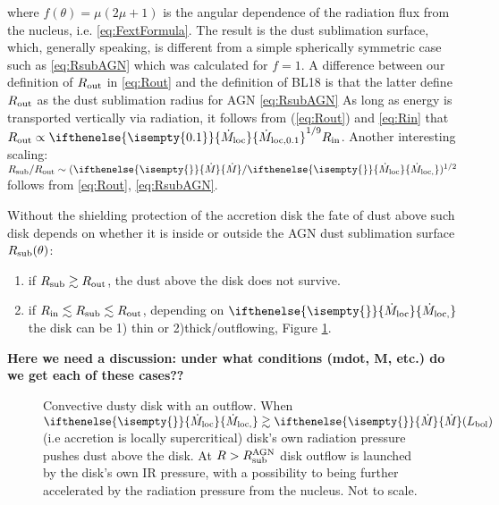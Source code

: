 \documentclass[12pt,english,preprint]{aastex}
\newcommand{\su}[2]{#1_{\rm #2}}
\newcommand{\mdt}[1][]{ 
  \ifthenelse{\isempty{#1}}
  {\dot{M}_{\rm loc}}
  { {\dot M}_{\rm{loc},{#1}} } 
  } %
\newcommand{\Mdt}[1][]{ 
    \ifthenelse{\isempty{#1}}
    {\dot{M}_{}}
    { {\dot M}_{{#1}} } 
} %
\newcommand{\Rout}{\su{R}{out}}
\newcommand{\Rin}{\su{R}{in}}
\newcommand{\rsub}{ \su{R}{sub} }
\begin{document}
\noindent where $f(\theta)=\mu(2\mu+1)$ is the angular dependence of the radiation flux from the nucleus, i.e. \eqref{eq:FextFormula}. 
The result is the dust sublimation surface, which, generally speaking, is different from a simple spherically symmetric case such as 
\eqref{eq:RsubAGN} which was calculated for $f=1$. 
A difference between our definition of $\su{R}{out}$
in \eqref{eq:Rout} and the definition of BL18 is that the latter
define $\su{R}{out}$ as the dust sublimation radius for AGN 
\eqref{eq:RsubAGN}
As long as energy is transported vertically via radiation, it follows
from (\ref{eq:Rout}) and \eqref{eq:Rin} that $\Rout\propto\mdt[0.1]^{1/9}\Rin$.
Another interesting scaling: $\su{R}{sub}/R_{{\rm out}}\sim (\Mdt/\mdt)^{1/2}$ 
follows from \eqref{eq:Rout}, \eqref{eq:RsubAGN}.

Without the shielding protection of the accretion disk the fate of
dust above such disk depends on whether it is inside or outside the
AGN dust sublimation surface $\rsub(\theta)$:

\begin{enumerate}
  \item if $\rsub \gtrsim \su{R}{out}$, the dust above the disk does not survive.
  \item if $\su{R}{in} \lesssim \rsub \lesssim \su{R}{out}$, depending on $\mdt$ the disk can 
  be 1) thin or 2)thick/outflowing, 
  Figure \ref{fig:DiskSketch}.  
\end{enumerate}

{\bf Here we need a discussion:  under what conditions 
(mdot, M, etc.) do we get each of these cases??}



\begin{figure}
  \caption{\label{fig:DiskSketch} 
  Convective dusty disk with an outflow.
  When $\mdt\gtrsim \Mdt  (L_{{\rm bol}})$ (i.e accretion is locally supercritical)
  disk's own radiation pressure pushes dust above the disk. 
  At  $R>\su{R}{sub}^{\rm AGN}$ disk outflow is launched by the disk's 
  own IR pressure, with a possibility to being further accelerated by the radiation
  pressure from the nucleus.
  Not to scale.}
  \end{figure}
  
\end{document}
